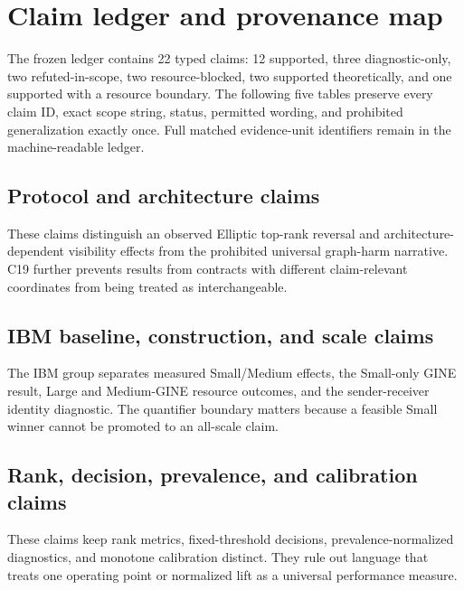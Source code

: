 \section{Claim ledger and provenance map}
\label{sec:s-claims-v2}

The frozen ledger contains 22 typed claims: 12 supported, three diagnostic-only, two refuted-in-scope, two resource-blocked, two supported theoretically, and one supported with a resource boundary. The following five tables preserve every claim ID, exact scope string, status, permitted wording, and prohibited generalization exactly once. Full matched evidence-unit identifiers remain in the machine-readable ledger.

\subsection{Protocol and architecture claims}



These claims distinguish an observed Elliptic top-rank reversal and architecture-dependent visibility effects from the prohibited universal graph-harm narrative. C19 further prevents results from contracts with different claim-relevant coordinates from being treated as interchangeable.

\subsection{IBM baseline, construction, and scale claims}



The IBM group separates measured Small/Medium effects, the Small-only GINE result, Large and Medium-GINE resource outcomes, and the sender-receiver identity diagnostic. The quantifier boundary matters because a feasible Small winner cannot be promoted to an all-scale claim.

\subsection{Rank, decision, prevalence, and calibration claims}



These claims keep rank metrics, fixed-threshold decisions, prevalence-normalized diagnostics, and monotone calibration distinct. They rule out language that treats one operating point or normalized lift as a universal performance measure.

